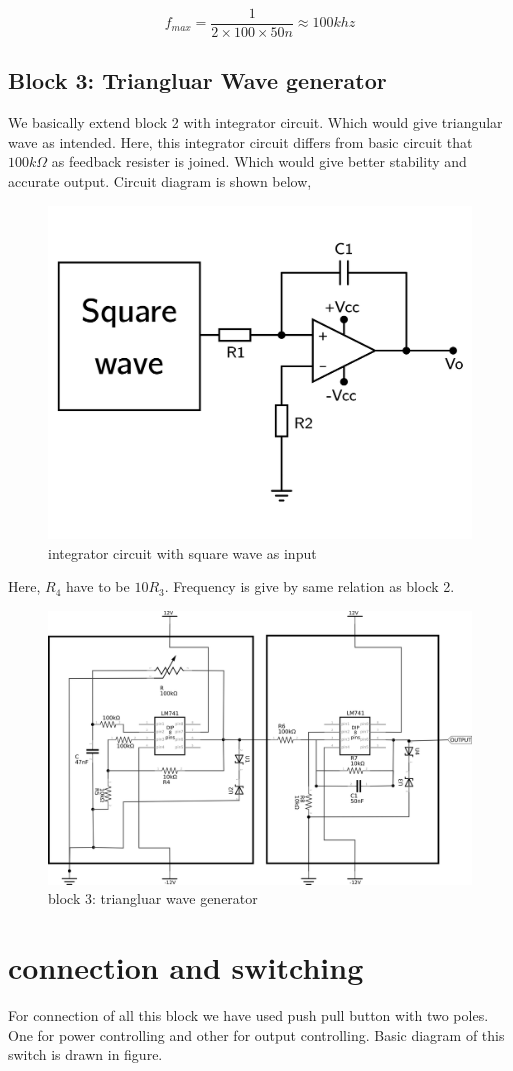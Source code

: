 \documentclass{article}
\begin{document}
\begin{equation*}
\label{eq:org3470ed3}
  f_{max} =\frac{1}{2\times 100 \times 50n} \approx 100 khz
\end{equation*}


\subsection{Block 3: Triangluar Wave generator}
\label{sec:org85c5923}

We basically extend block 2 with integrator circuit. Which would give triangular wave as intended. Here, this integrator circuit differs from basic circuit that \(100k\Omega\) as feedback resister is joined. Which would give better stability and accurate output. Circuit diagram is shown below,



\begin{figure}[htbp]
\centering
\includegraphics[width=0.7 \textwidth]{imgs/triang.png}
\caption{\label{fig:org66d79b1}integrator circuit with square wave as input}
\end{figure}


Here, \(R_{4}\) have to be \(10R_{3}\). Frequency is give by same relation as block 2.



\begin{figure}[htbp]
\centering
\includegraphics[width=0.95 \textwidth]{imgs/triangreal.png}
\caption{\label{fig:orgc55386a}block 3: triangluar wave generator}
\end{figure}




\section{connection and switching}
\label{sec:org3609da7}

For connection of all this block we have used push pull button with two poles. One for power controlling and other for output controlling. Basic diagram of this switch is drawn in figure.
\end{document}
